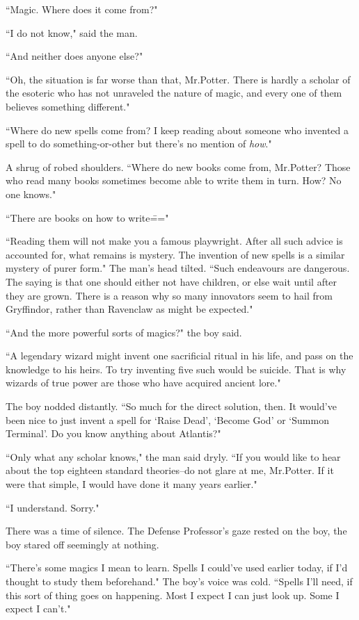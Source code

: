``Magic. Where does it come from?"

``I do not know," said the man.

``And neither does anyone else?"

``Oh, the situation is far worse than that, Mr.\?Potter. There is hardly a scholar of the esoteric who has not unraveled the nature of magic, and every one of them believes something different."

``Where do new spells come from? I keep reading about someone who invented a spell to do something-or-other but there's no mention of \emph{how}."

A shrug of robed shoulders. ``Where do new books come from, Mr.\?Potter? Those who read many books sometimes become able to write them in turn. How? No one knows."

``There are books on how to write\==="

``Reading them will not make you a famous playwright. After all such advice is accounted for, what remains is mystery. The invention of new spells is a similar mystery of purer form." The man's head tilted. ``Such endeavours are dangerous. The saying is that one should either not have children, or else wait until after they are grown. There is a reason why so many innovators seem to hail from Gryffindor, rather than Ravenclaw as might be expected."

``And the more powerful sorts of magics?" the boy said.

``A legendary wizard might invent one sacrificial ritual in his life, and pass on the knowledge to his heirs. To try inventing five such would be suicide. That is why wizards of true power are those who have acquired ancient lore."

The boy nodded distantly. ``So much for the direct solution, then. It would've been nice to just invent a spell for `Raise Dead', `Become God' or `Summon Terminal'. Do you know anything about Atlantis?"

``Only what any scholar knows," the man said dryly. ``If you would like to hear about the top eighteen standard theories\---do not glare at me, Mr.\?Potter. If it were that simple, I would have done it many years earlier."

``I understand. Sorry."

There was a time of silence. The Defense Professor's gaze rested on the boy, the boy stared off seemingly at nothing.

``There's some magics I mean to learn. Spells I could've used earlier today, if I'd thought to study them beforehand." The boy's voice was cold. ``Spells I'll need, if this sort of thing goes on happening. Most I expect I can just look up. Some I expect I can't."

